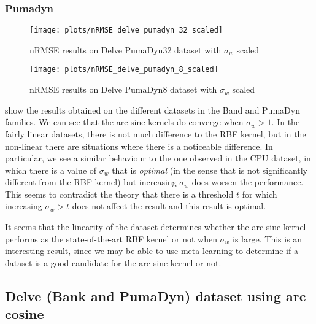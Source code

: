 \subsubsection{Pumadyn}

\begin{figure}[H]
    \texttt{[image: plots/nRMSE\_delve\_pumadyn\_32\_scaled]}
    \caption{nRMSE results on Delve PumaDyn32 dataset with $\sigma_w$ scaled}
    \label{fig:nrmse-delve-pumadyn-32-scaled}
\end{figure}

\begin{figure}[H]
    \texttt{[image: plots/nRMSE\_delve\_pumadyn\_8\_scaled]}
    \caption{nRMSE results on Delve PumaDyn8 dataset with $\sigma_w$ scaled}
    \label{fig:nrmse-delve-pumadyn-8-scaled}
\end{figure}

show the results obtained on the different datasets in the Band and PumaDyn
families. We can see that the arc-sine kernels do converge when $\sigma_w > 1$.
In the fairly linear datasets, there is not much difference to the RBF kernel,
but in the non-linear there are situations where there is a noticeable
difference. In particular, we see a similar behaviour to the one observed in the
CPU dataset, in which there is a value of $\sigma_w$ that is \emph{optimal} (in
the sense that is not significantly different from the RBF kernel) but
increasing $\sigma_w$ does worsen the performance. This seems to contradict the
theory that there is a threshold $t$ for which increasing $\sigma_w > t$ does
not affect the result and this result is optimal.

It seems that the linearity of the dataset determines whether the arc-sine
kernel performs as the state-of-the-art RBF kernel or not when $\sigma_w$ is
large. This is an interesting result, since we may be able to use meta-learning
to determine if a dataset is a good candidate for the arc-sine kernel or not.


\subsection{Delve (Bank and PumaDyn) dataset using arc cosine}


